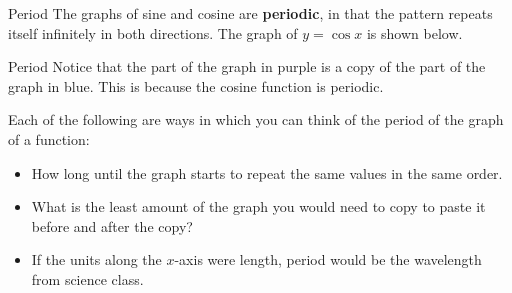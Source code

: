\documentclass[t,usenames,dvipsnames]{beamer}
\begin{document}
\begin{frame}{Period}
The graphs of sine and cosine are \textbf{periodic}, in that the pattern repeats itself infinitely in both directions. The graph of $y = \cos x$ is shown below.    \newline\\ 

\begin{center}
\end{center}
\end{frame}

\begin{frame}{Period}
Notice that the part of the graph in purple is a copy of the part of the graph in blue. This is because the cosine function is \alert{periodic}.   \newline\\   \pause

Each of the following are ways in which you can think of the period of the graph of a function:   \pause  \newline\\
\begin{itemize}
    \item How long until the graph starts to repeat the same values in the same order.  \pause  \newline\\
    \item What is the least amount of the graph you would need to copy to paste it before and after the copy?   \pause  \newline\\
    \item If the units along the $x$-axis were length, period would be the wavelength from science class.
\end{itemize}
\end{frame}
\end{document}
